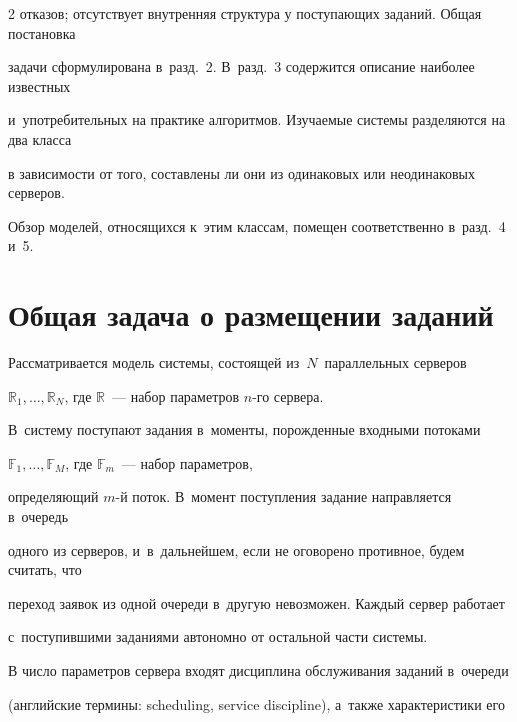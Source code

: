\begin{multicols}{2}
отказов; отсутствует внутренняя структура у поступающих заданий. Общая постановка 


задачи сформулирована в~разд.~2. В~разд.~3 содержится описание наиболее известных 


и~употребительных на практике алгоритмов. Изучаемые системы разделяются на два класса 


в зависимости от того, составлены ли они из одинаковых или не\-оди\-на\-ко\-вых серверов. 


Обзор моделей, относящихся к~этим классам, помещен соответственно в~разд.~4 и~5.





\vspace*{-6pt}





\section{Общая задача о размещении заданий}





\vspace*{-2pt}





    Рассматривается модель системы, состоящей из~$N$~параллельных серверов 


$\mathbb{R}_1,\ldots, \mathbb{R}_N$, где $\mathbb{R}$~--- набор параметров $n$-го сервера. 


В~систему поступают задания в~моменты, порожденные входными потоками 


$\mathbb{F}_1,\ldots, \mathbb{F}_M$, где $\mathbb{F}_m$~--- набор параметров, 


определяющий $m$-й поток. В~момент поступления задание направляется в~очередь 


одного из серверов, и~в~дальнейшем, если не оговорено противное, будем считать, что 


переход заявок из одной очереди в~другую невозможен. Каждый сервер работает 


с~поступившими заданиями автономно от остальной части системы.


    


    В число параметров сервера входят дисциплина обслуживания заданий в~очереди 


(английские термины: scheduling, service discipline), а~также характеристики его 



\end{multicols}
